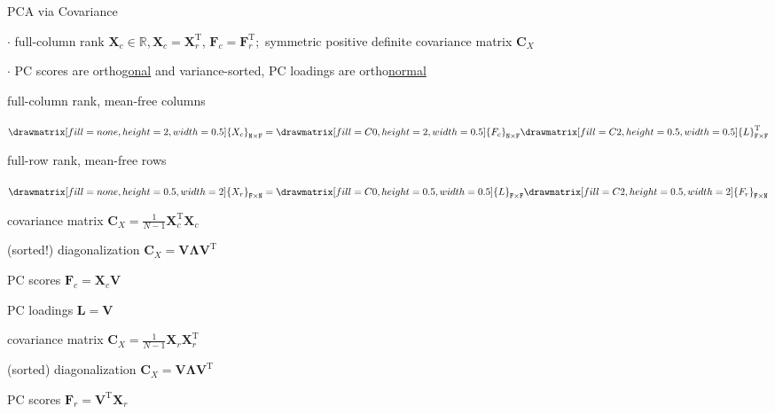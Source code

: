 \documentclass[mathserif, aspectratio=1610]{intbeamer}
\begin{document}
\begin{frame}[t]{PCA via Covariance}

$\cdot$ full-column rank $\bm{X}_c \in\mathbb{R}$,\,$\bm{X}_c = \bm{X}_r^\mathrm{T}$, $\bm{F}_c = \bm{F}_r^\mathrm{T}$;\,
symmetric positive definite covariance matrix $\bm{C}_X$

$\cdot$ PC scores are ortho\underline{gonal} and variance-sorted, PC loadings are ortho\underline{normal}

\vspace{0.5em}
\begin{minipage}[t]{0.49\textwidth}
full-column rank, mean-free columns
\begin{center}
$
\def\F{0.5}
\def\N{2}
\drawmatrix[fill=none, height=\N, width=\F]{X_{c}}_\mathtt{N \times F}
=
\drawmatrix[fill=C0, height=\N, width=\F]{F_{c}}_\mathtt{N \times F}
\drawmatrix[fill=C2, height=\F, width=\F]{L}_\mathtt{F \times F}^\mathrm{T}
$
\end{center}
\end{minipage}
%
\begin{minipage}[t]{0.49\textwidth}
full-row rank, mean-free rows
\begin{center}
$
\def\F{0.5}
\def\N{2}
\drawmatrix[fill=none, height=\F, width=\N]{X_{r}}_\mathtt{F \times N}
=
\drawmatrix[fill=C0, height=\F, width=\F]{L}_\mathtt{F \times F}
\drawmatrix[fill=C2, height=\F, width=\N]{F_{r}}_\mathtt{F \times N}
$
\end{center}
\end{minipage}

\vspace{0.5em}

\begin{minipage}[t]{0.49\textwidth}
covariance matrix $\bm{C}_X = \frac{1}{N-1}\bm{X}_c^\mathrm{T}\bm{X}_c$

(sorted!) diagonalization $\bm{C}_X = \bm{V} \bm{\Lambda} \bm{V}^\mathrm{T}$

PC scores $\bm{F}_c = \bm{X}_c \bm{V}$

PC loadings $\bm{L} = \bm{V}$

\end{minipage}
%
\begin{minipage}[t]{0.49\textwidth}
covariance matrix $\bm{C}_X = \frac{1}{N-1}\bm{X}_r\bm{X}_r^\mathrm{T}$

(sorted) diagonalization $\bm{C}_X = \bm{V} \bm{\Lambda} \bm{V}^\mathrm{T}$

PC scores $\bm{F}_r = \bm{V}^\mathrm{T} \bm{X}_r$


\end{minipage}
\end{frame}
\end{document}
